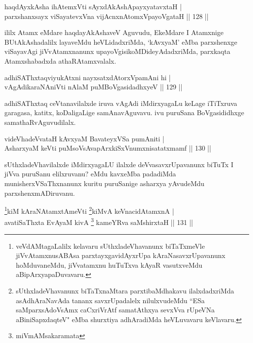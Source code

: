 \begin{shl}
haqdAyxkAsha ihA\s \s temxVti sAyxdAkAshApayxyatavxtaH |\\
parxshanxsayx viSayatevxVna vijAcnxnAtomxVpayoVgataH \hfill || 128 ||
\end{shl}

\begin{artha}
ililx Atamx eMdare haqdayAkAshaveV Aguvudu, EkeMdare I Atamxnige BUtAkAshadalilx layaveMdu heVLidadxriMda, `kAvxyaM' eMba parxshenxge viSayavAgi jiVvAtamxnanunx upayoVgisikoMDideyAdadxriMda, parxkaqta Atamxshabadxda athaR\break Atamxvalalx.
\end{artha}


\begin{shl}
adhiSAThxtaqviyukAtxni nayxsatxdAtorxVpamAni hi |\\
vAgAdikaraNAniVti nAlaM puMBoVgasidadhxyeV \hfill || 129 ||
\end{shl}

\begin{artha}
adhiSAThxtaq ceVtanavilalxde iruva vAgAdi iMdirxyagaLu keLage iTiTxruva garagasa, katitx, koDaligaLige samAnavAguvavu.  ivu puruSana BoVgasididhxge samathaRvAguvudilalx.
\end{artha}


\begin{shl}
videVhadeVvataH kAvxyaM BavateyxVSa pumAniti |\\
AsharxyaM keVti puMsoV\s sAvapArxkiSxVnumxnisatatxmamf \hfill || 130 ||
\end{shl}

\begin{artha}
sUthxladeVhavilalxde iMdirxyagaLU ilalxde deVvasavxrUpavanunx biTuTx I jiVva puruSanu elilxruvanu? eMdu kavxeMba padadiMda munisherxVSaThxnanunx kuritu puruSanige asharxya yAvudeMdu parxshenxmADiruvanu.
\end{artha}


\begin{shl}
\footnote{veVdAMtagaLalilx kelavaru sUthxladeVhavanunx biTaTxmeVle jiVvAtamxnusABAsa parxtayxgavidAyxrUpa kAraNasavxrUpavanunx hoMduvaneMdu, jiVvatamxnu huTuTxva kAyaR vasutxveMdu aBipArxyapaDuvavaru.}kiM kAraNAtamxtAmeVti \footnote{sUthxladeVhavanunx biTaTxnaMtara parxtibaMdhakavu ilalxdadxriMda asAdhAraNavAda tananx savxrUpadalelx nilulxvudeMdu ``ESa saMparxsAdoVsAmx caCxriVrAtf samatAthxya sevxVva rUpeVNa aBiniSapxdaqteV" eMba shurxtiya adhAradiMda heVLuvavaru keVlavaru.}kiMvA keVnacidAtamxnA |\\
avatiSaThxta EvAyaM kivA \footnote{miVmAMsakaramata} kameYRva saMshirxtaH \hfill || 131 ||
\end{shl}

